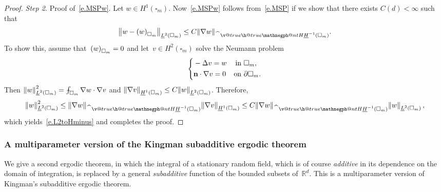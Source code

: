 \documentclass[11pt]{article} %
\makeatletter
\let\oldsquare\square %
\renewcommand{\square}{\oldsquare}
\numberwithin{equation}{section}
\theoremstyle{definition}
\let\originalleft\left
\let\originalright\right
\renewcommand{\left}{\mathopen{}\mathclose\bgroup\originalleft}
\renewcommand{\right}{\aftergroup\egroup\originalright}
\newcommand*{\Rd}{\ensuremath{\mathbb{R}^d}}
\renewcommand*{\hat}{\widehat}
\newcommand{\cu}{\square}
\def\Xint#1{\mathchoice
{\XXint\displaystyle\textstyle{#1}}%
{\XXint\textstyle\scriptstyle{#1}}%
{\XXint\scriptstyle\scriptscriptstyle{#1}}%
{\XXint\scriptscriptstyle\scriptscriptstyle{#1}}%
\!\int}
\def\XXint#1#2#3{{\setbox0=\hbox{$#1{#2#3}{\int}$}
\vcenter{\hbox{$#2#3$}}\kern-.5\wd0}}
\def\fint{\Xint-}
\newcommand{\negphantom}{\v@true\h@true\negph@nt}
\newcommand{\negph@nt}{\ifmmode\expandafter\mathpalette 
  \expandafter\mathnegph@nt\else\expandafter\makenegph@nt\fi}
\newcommand{\makenegph@nt}[1]{%
  \setbox\z@\hbox{\color@begingroup#1\color@endgroup}\finnegph@nt}
\newcommand{\finnegph@nt}{%
  \setbox\tw@\null 
  \ifv@ \ht\tw@\ht\z@\dp\tw@\dp\z@\fi \ifh@\wd\tw@-\wd\z@\fi\box\tw@}
\newcommand{\mathnegph@nt}[2]{%
  \setbox\z@\hbox{$\m@th #1{#2}$}\finnegph@nt}
\newcommand{\Hminusul}{\hat{\phantom{H}}\negphantom{H}\underline{H}^{-1}}
\makeatother
\begin{document}
\begin{proof}
\emph{Step 2.} Proof of~\eqref{e.MSPw}.
Let $w \in H^1(\cu_{m})$. Now~\eqref{e.MSPw} follows from~\eqref{e.MSP} if we show that there exists $C(d)<\infty$ such that 
\begin{equation} \label{e.L2toHminus}
\left\| w - \left( w \right)_{\cu_{m}} \right\|_{\underline{L}^2(\cu_{m})} \leq C \left\|\nabla w\right\|_{\Hminusul(\cu_m)} 
.
\end{equation}
To show this, assume that~$\left( w \right)_{\cu_{m}} = 0$ and let~$v\in H^2(\cu_{m})$ solve the Neumann problem 
\begin{equation}
\left\{
\begin{aligned}
& -\Delta v = w & \mbox{in} & \ \cu_{m}, \\
& \mathbf{n} \cdot \nabla v = 0 & \mbox{on} & \ \partial \cu_{m} .
\end{aligned}
\right.
\end{equation}
Then 
$\left\| w \right\|_{\underline{L}^2(\cu_{m})}^2 = \fint_{\cu_{m}} \nabla w \cdot \nabla v$ and 
$\left\| \nabla v\right\|_{\underline{H}^1(\cu_{m})} \leq C \left\| w \right\|_{\underline{L}^2(\cu_{m})}$. Therefore,
\begin{align*}  
\left\| w \right\|_{\underline{L}^2(\cu_{m})}^2 
\leq 
\left\|\nabla w\right\|_{\Hminusul(\cu_m)} \left\| \nabla v\right\|_{\underline{H}^1(\cu_{m})} 
\leq
C \left\|\nabla w\right\|_{\Hminusul(\cu_m)} \left\| w \right\|_{\underline{L}^2(\cu_{m})} 
\,,
\end{align*}
which yields~\eqref{e.L2toHminus} and completes the proof. 
\end{proof}





\subsubsection{A multiparameter version of the Kingman subadditive ergodic theorem}

We give a second ergodic theorem, in which the integral of a stationary random field, which is of course \emph{additive} in its dependence on the domain of integration, is replaced by a general \emph{subadditive} function of the bounded subsets of~$\Rd$. This is a multiparameter version of Kingman's subadditive ergodic theorem. 

\smallskip
\end{document}
